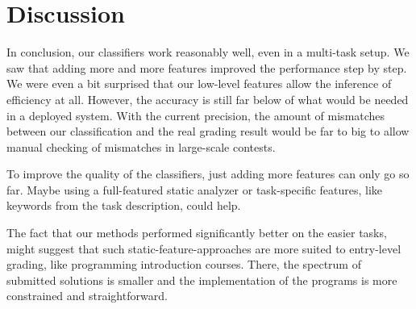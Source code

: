 \section{Discussion}

In conclusion, our classifiers work reasonably well, even in a multi-task setup. We saw that adding more and more features improved the performance step by step. We were even a bit surprised that our low-level features allow the inference of efficiency at all. However, the accuracy is still far below of what would be needed in a deployed system. With the current precision, the amount of mismatches between our classification and the real grading result would be far to big to allow manual checking of mismatches in large-scale contests.

To improve the quality of the classifiers, just adding more features can only go so far. Maybe using a full-featured static analyzer or task-specific features, like keywords from the task description, could help.

The fact that our methods performed significantly better on the easier tasks, might suggest that such static-feature-approaches are more suited to entry-level grading, like programming introduction courses. There, the spectrum of submitted solutions is smaller and the implementation of the programs is more constrained and straightforward.